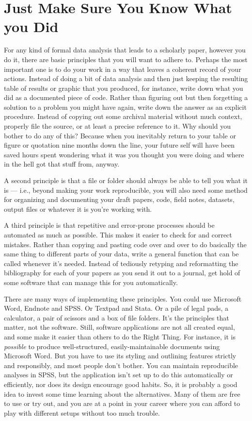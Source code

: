 \documentclass[11pt,article,oneside]{memoir}
\begin{document}
\section{Just Make Sure You Know What you Did} %
\label{sec:make_it_so_that_you_know_what_you_did}
For any kind of formal data analysis that leads to a scholarly paper, however you do it, there are basic principles that you will want to adhere to. Perhaps the most important one is to do your work in a way that leaves a coherent record of your actions. Instead of doing a bit of data analysis and then just keeping the resulting table of results or graphic that you produced, for instance, write down what you did as a documented piece of code. Rather than figuring out but then forgetting a solution to a problem you might have again, write down the answer as an explicit procedure. Instead of copying out some archival material without much context, properly file the source, or at least a precise reference to it. Why should you bother to do any of this? Because when you inevitably return to your table or figure or quotation nine months down the line, your future self will have been saved hours spent wondering what it was you thought you were doing and where in the hell got that stuff from, anyway. 

A second principle is that a file or folder should always be able to tell you what it is --- i.e., beyond making your work reproducible, you will also need some method for organizing and documenting your draft papers, code, field notes, datasets, output files or whatever it is you're working with. 

A third principle is that repetitive and error-prone processes should be automated as much as possible. This makes it easier to check for and correct mistakes. Rather than copying and pasting code over and over to do basically the same thing to different parts of your data, write a general function that can be called whenever it's needed. Instead of tediously retyping and reformatting the bibliography for each of your papers as you send it out to a journal, get hold of some software that can manage this for you automatically.

There are many ways of implementing these principles. You could use Microsoft Word, Endnote and SPSS. Or Textpad and Stata. Or a pile of legal pads, a calculator, a pair of scissors and a box of file folders. It's the principles that matter, not the software. Still, software applications are not all created equal, and some make it easier than others to do the Right Thing. For instance, it is \emph{possible} to produce well-structured, easily-maintainable documents using Microsoft Word. But you have to use its styling and outlining features strictly and responsibly, and most people don't bother. You can maintain reproducible analyses in SPSS, but the application isn't set up to do this automatically or efficiently, nor does its design encourage good habits. So, it is probably a good idea to invest some time learning about the alternatives. Many of them are free to use or try out, and you are at a point in your career where you can afford to play with different setups without too much trouble.
\end{document}
